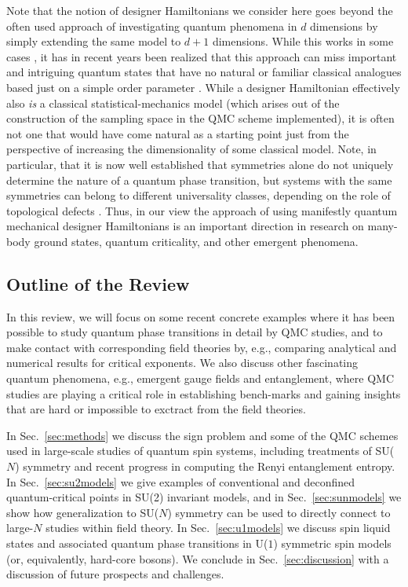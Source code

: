 \documentclass[range]{ar2e}
\begin{document}
Note that the notion of designer Hamiltonians we consider here goes beyond the often used approach of investigating quantum phenomena 
in $d$ dimensions by simply extending the same model to $d+1$ dimensions. While this works in some cases \cite{Rieger94,Sorensen92,Nahum11}, 
it has in recent years been realized that this approach can miss important and intriguing quantum states that have no natural or familiar 
classical analogues based just on a simple order parameter \cite{Senthil04a,Fradkin04,Sachdev08}. While a designer Hamiltonian effectively also {\it is} 
a classical statistical-mechanics model (which arises out of the construction of the sampling space in the QMC scheme implemented), it is 
often not one that would have come natural as a starting point just from the perspective of increasing the dimensionality of some
classical model. Note, in particular, that it is now well established that symmetries alone do not uniquely determine the nature of a 
quantum phase transition, but systems with the same symmetries can belong to different universality classes, depending on the role of topological 
defects \cite{Motrunich04}. Thus, in our view the approach of using manifestly quantum mechanical designer Hamiltonians is an important direction
in research on many-body ground states, quantum criticality, and other emergent phenomena.

\subsection{Outline of the Review}

In this review, we will focus on some recent concrete examples where it has been possible to study quantum phase transitions in detail 
by QMC studies, and to make contact with corresponding field theories by, e.g., comparing analytical and numerical results for critical 
exponents. We also discuss other fascinating quantum phenomena, e.g., emergent gauge fields and entanglement, where QMC studies are
playing a critical role in establishing bench-marks and gaining insights that are hard or impossible to exctract from the field theories.

In Sec.~\ref{sec:methods} we discuss the sign problem and some of the QMC schemes used in large-scale studies of quantum spin systems, 
including treatments of SU($N$) symmetry and recent progress in computing the Renyi entanglement entropy. In Sec.~\ref{sec:su2models} 
we give examples of conventional and deconfined quantum-critical points in SU(2) invariant models, and in Sec.~\ref{sec:sunmodels} 
we show how generalization to SU($N$) symmetry can be used to directly connect to large-$N$ studies within field theory. In Sec.~\ref{sec:u1models} 
we discuss spin liquid states and associated quantum phase transitions in U($1$) symmetric spin models (or, equivalently, hard-core bosons). 
We conclude in Sec.~\ref{sec:discussion} with a discussion of future prospects and challenges.
\end{document}
